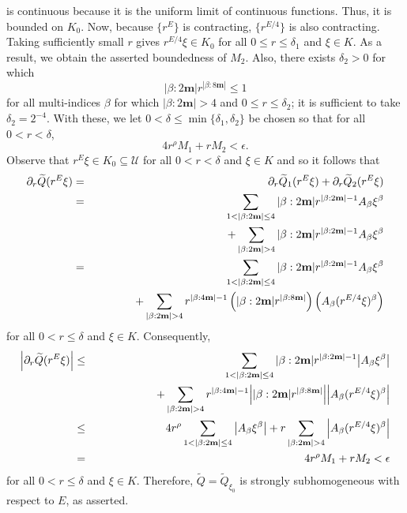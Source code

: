 \documentclass[smallextended]{svjour3}
\theoremstyle{remark}
\renewenvironment{proof}[1][\proofname]{\renewcommand\xproofname{#1}\xproof}{\endxproof}
\begin{document}
\begin{proof}
is continuous because it is the uniform limit of continuous functions. Thus, it is bounded on $K_0$. Now, because $\{r^E\}$ is contracting, $\{ r^{E/4} \}$ is also contracting. Taking sufficiently small $r$ gives $r^{E/4}\xi \in K_0$ for all $0 \leq r \leq \delta_1$ and $\xi \in K$. As a result, we obtain the asserted boundedness of $M_2$. Also, there exists $\delta_2>0$ for which
\begin{equation*}
    |\beta:2\mathbf{m}|r^{|\beta:8\mathbf{m}|}\leq 1
\end{equation*}
for all multi-indices $\beta$ for which $|\beta:2\mathbf{m}|> 4$ and $0\leq r\leq \delta_2$; it is sufficient to take $\delta_2 = 2^{-4}$. With these, we let $0<\delta\leq\min\{\delta_1,\delta_2\}$ be chosen so that for all $0 < r < \delta$,
\begin{equation*}
    4r^\rho M_1+r M_2<\epsilon. 
\end{equation*}
Observe that $r^{E}\xi\in K_0\subseteq\mathcal{U}$ for all $0<r<\delta$ and $\xi\in K$ and so it follows that
\begin{eqnarray*}
    \partial_r\widetilde{Q}(r^E\xi)&=&\partial_r\widetilde{Q}_1(r^E\xi)+\partial_r\widetilde{Q}_2(r^E\xi)\\
    &=&\sum_{1<|\beta:2\mathbf{m}|\leq 4}|\beta:2\mathbf{m}|r^{|\beta:2\mathbf{m}|-1}A_\beta\xi^\beta\\
    &&\hspace{0.5in}+\sum_{|\beta:2\mathbf{m}|> 4}|\beta:2\mathbf{m}|r^{|\beta:2\mathbf{m}|-1}A_\beta\xi^\beta\\
    &=&\sum_{1<|\beta:2\mathbf{m}|\leq 4}|\beta:2\mathbf{m}|r^{|\beta:2\mathbf{m}|-1}A_\beta\xi^\beta \\
    &&\hspace{0.5in} +\sum_{|\beta:2\mathbf{m}|>4} r^{|\beta:4\mathbf{m}|-1}\left(|\beta:2\mathbf{m}|r^{|\beta:8\mathbf{m}|}\right)\left(A_\beta (r^{E/4}\xi)^\beta\right)
\end{eqnarray*}
for all $0<r\leq\delta$ and $\xi\in K$. Consequently,
\begin{eqnarray*}
    \abs{\partial_r\widetilde{Q}(r^E\xi)}&\leq & \sum_{1<|\beta:2\mathbf{m}|\leq 4}|\beta:2\mathbf{m}|r^{|\beta:2\mathbf{m}|-1}\abs{A_\beta\xi^\beta}\\
    &&\hspace{0.75in}+\sum_{|\beta:2\mathbf{m}|>4}r^{|\beta:4\mathbf{m}|-1}\abs{|\beta:2\mathbf{m}|r^{|\beta:8\mathbf{m}|}}\abs{A_\beta (r^{E/4}\xi)^\beta}\\
    &\leq&4 r^\rho \sum_{1<|\beta:2\mathbf{m}|\leq 4}\abs{A_\beta \xi^\beta}+r\sum_{|\beta:2\mathbf{m}|>4}\abs{A_\beta(r^{E/4}\xi)^\beta}\\
    &=&4 r^\rho M_1+rM_2<\epsilon
\end{eqnarray*}
for all $0<r\leq\delta$ and $\xi\in K$. Therefore, $\widetilde{Q}=\widetilde{Q}_{\xi_0}$ is strongly subhomogeneous with respect to $E$, as asserted. \\


\end{proof}
\end{document}
